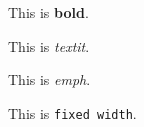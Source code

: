 
  This is \textbf{bold}.

  This is \textit{textit}.

  This is \emph{emph}.

  This is \texttt{fixed width}.

